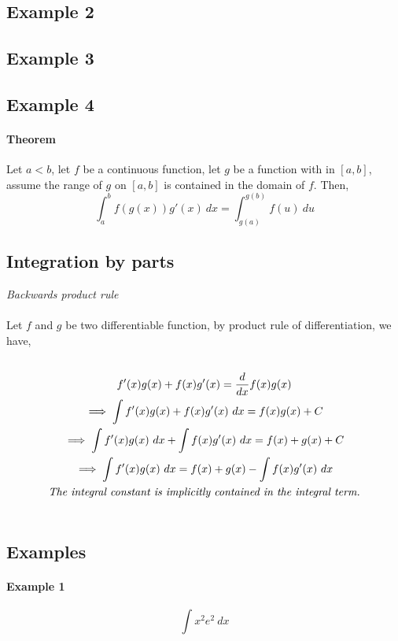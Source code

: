 \documentclass{article}
\begin{document}
	\subsection{Example 2}
	\subsection{Example 3}
	\subsection{Example 4}
	\paragraph{Theorem} Let $a < b$, let $f$ be a continuous function, let $g$ be a function with  in $[a,b]$, assume the range of $g$ on $[a,b]$ is contained in the domain of $f$. Then,
	\[
		\int_a^{b}{f(g(x))g'(x)\ dx} = \int_{g(a)}^{g(b)}{f(u)\ du}
	\]
	\subsection{Integration by parts}
	\emph{Backwards product rule}
	\paragraph{} Let $f$ and $g$ be two differentiable function, by product rule of differentiation, we have,
	\begin{multline*}
	\\
		f'(x)g(x) + f(x)g'(x) = \frac{d}{dx}{f(x)g(x)} \\
		\implies \int{f'(x)g(x) + f(x)g'(x)\ dx} = f(x)g(x) + C \\
		\implies \int{f'(x)g(x)\ dx} + \int{f(x)g'(x)\ dx} = f(x) + g(x) + C \\
		\implies \int{f'(x)g(x)\ dx} = f(x) + g(x) - \int{f(x)g'(x)\ dx} \\
		\emph{The integral constant is implicitly contained in the integral term.} \\
	\\
	\end{multline*}
	
	\subsection{Examples}
	\paragraph{Example 1}
	\[
		\int{x^2 e^2\ dx}
	\]
\end{document}
